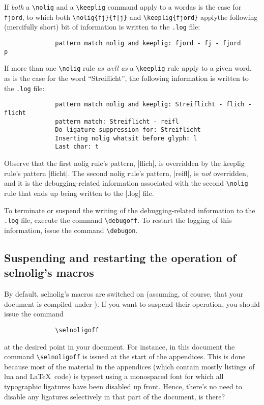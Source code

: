 \documentclass[11pt]{article}
\newcommand{\pkg}[1]{\textsf{#1}}
\newcommand{\opt}[1]{\texttt{#1}}
\newcommand{\cmmd}[1]{\texttt{\textbackslash #1}}
\begin{document}
If \emph{both} a \cmmd{nolig} and a \cmmd{keeplig} command apply to a word\textemdash as is the case for \opt{fjord}, to which both \Verb+\nolig{fj}{f|j}+ and \Verb+\keeplig{fjord}+ apply\textemdash the following (mercifully short) bit of information is written to the \opt{.log} file:
\begin{Verbatim}
              pattern match nolig and keeplig: fjord - fj - fjord
p\end{Verbatim}

If more than one \cmmd{nolig} rule \emph{as well as} a \cmmd{keeplig} rule apply to a given word, as is the case for the word \enquote{Streiflicht}, the following information is written to the \opt{.log} file:
\begin{Verbatim}
              pattern match nolig and keeplig: Streiflicht - flich - flicht
              pattern match: Streiflicht - reifl
              Do ligature suppression for: Streiflicht
              Inserting nolig whatsit before glyph: l
              Last char: t
              \end{Verbatim}

Observe that the first nolig rule's pattern, |flich|, is overridden by the keeplig rule's pattern |flicht|. The second nolig rule's pattern, |reifl|, is \emph{not} overridden, and it is the debugging-related information associated with the second \cmmd{nolig} rule that ends up being written to the |.log| file. 

To terminate or suspend the writing of the debugging-related information to the \opt{.log} file, execute the command \cmmd{debugoff}. To restart the logging of this information, issue the command \cmmd{debugon}.



\subsection[Suspending and restarting the operation of selnolig's macros]{Suspending and restarting the operation of \pkg{selnolig}'s macros} \label{sec:selnoligon}

By default, \pkg{selnolig}'s macros are switched on (assuming, of course, that your document is compiled under \LuaLaTeX). If you want to suspend their operation, you should issue the command
\begin{Verbatim}
              \selnoligoff
\end{Verbatim}
at the desired point in your document. For instance, in this document the command \cmmd{selnoligoff} is issued at the start of the appendices. This is done because most of the material in the appendices (which contain mostly listings of lua and \LaTeX\ code) is typeset using a monospaced font for which all typographic ligatures have been disabled up front. Hence, there's no need to disable any ligatures selectively in that part of the document, is there?
\end{document}
